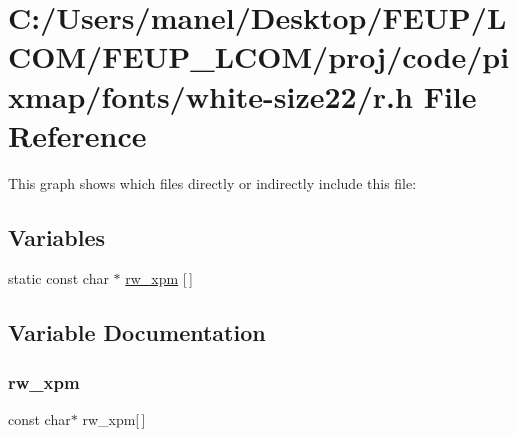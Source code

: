 \hypertarget{white-size22_2r_8h}{}\section{C\+:/\+Users/manel/\+Desktop/\+F\+E\+U\+P/\+L\+C\+O\+M/\+F\+E\+U\+P\+\_\+\+L\+C\+O\+M/proj/code/pixmap/fonts/white-\/size22/r.h File Reference}
\label{white-size22_2r_8h}
This graph shows which files directly or indirectly include this file\+:
\subsection*{Variables}
\begin{DoxyCompactItemize}
\item 
static const char $\ast$ \mbox{\hyperlink{white-size22_2r_8h_a1fca0de62d90ff20fd65472f4f298004}{rw\+\_\+xpm}} \mbox{[}$\,$\mbox{]}
\end{DoxyCompactItemize}


\subsection{Variable Documentation}
\mbox{\label{white-size22_2r_8h_a1fca0de62d90ff20fd65472f4f298004}} 
\subsubsection{\texorpdfstring{rw\_xpm}{rw\_xpm}}
{\footnotesize\ttfamily const char$\ast$ rw\+\_\+xpm\mbox{[}$\,$\mbox{]}\hspace{0.3cm}{\ttfamily [static]}}

